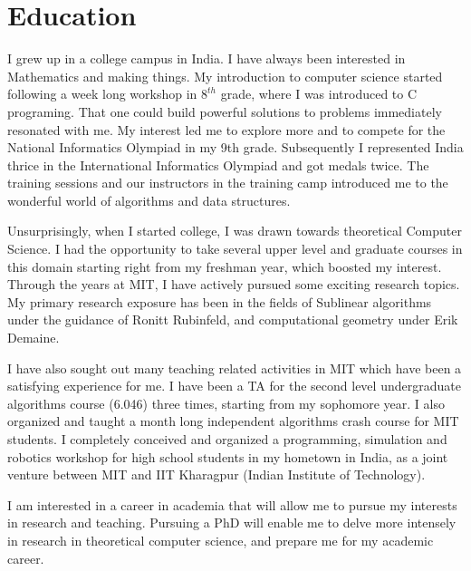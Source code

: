 \section*{Education}
I grew up in a college campus in India. I have always been interested in Mathematics and making things. 
My introduction to computer science started following a week long workshop in $8^{th}$ grade,
where I was introduced to C programing.
That one could build powerful solutions to problems immediately resonated with me.
My interest led me to explore more and to compete for the National Informatics Olympiad in my 9th grade.
Subsequently I represented India thrice in the International Informatics Olympiad and got medals twice.
The training sessions and our instructors in the training camp introduced me
to the wonderful world of algorithms and data structures.

Unsurprisingly, when I started college, I was drawn towards theoretical Computer Science.
I had the opportunity to take several upper level and graduate courses in this domain
starting right from my freshman year, which boosted my interest.
Through the years at MIT, I have actively pursued some exciting research topics.
My primary research exposure has been in the fields of Sublinear algorithms
under the guidance of Ronitt Rubinfeld, and computational geometry under Erik Demaine.

I have also sought out many teaching related activities in MIT which have been a satisfying experience for me.
I have been a TA for the second level undergraduate algorithms course (6.046) three times, starting from my sophomore year.
I also organized and taught a month long independent algorithms crash course for MIT students.
I completely conceived and organized a programming, simulation and robotics workshop for high school students
in my hometown in India, as a joint venture between MIT and IIT Kharagpur (Indian Institute of Technology).

I am interested in a career in academia that will allow me to pursue my interests in research and teaching.
Pursuing a PhD will enable me to delve more intensely in research in theoretical computer science,
and prepare me for my academic career.
